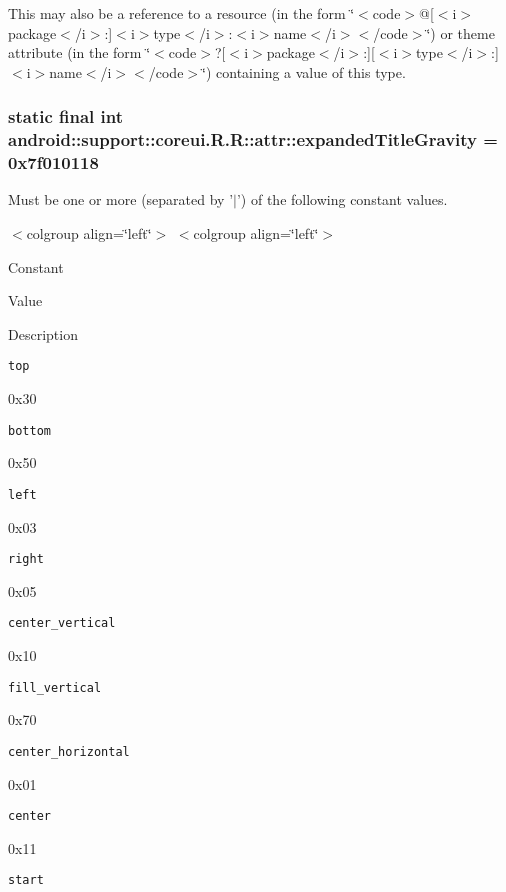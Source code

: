 This may also be a reference to a resource (in the form \char`\"{}$<$code$>$@\mbox{[}$<$i$>$package$<$/i$>$:\mbox{]}$<$i$>$type$<$/i$>$:$<$i$>$name$<$/i$>$$<$/code$>$\char`\"{}) or theme attribute (in the form \char`\"{}$<$code$>$?\mbox{[}$<$i$>$package$<$/i$>$:\mbox{]}\mbox{[}$<$i$>$type$<$/i$>$:\mbox{]}$<$i$>$name$<$/i$>$$<$/code$>$\char`\"{}) containing a value of this type. \hypertarget{classandroid_1_1support_1_1coreui_1_1_r_1_1attr_476150917397124263d793388f178fd0}{
\subsubsection[{expandedTitleGravity}]{\setlength{\rightskip}{0pt plus 5cm}static final int android::support::coreui.R.R::attr::expandedTitleGravity = 0x7f010118}}
\label{classandroid_1_1support_1_1coreui_1_1_r_1_1attr_476150917397124263d793388f178fd0}


Must be one or more (separated by '$|$') of the following constant values. \begin{TabularC}{0}
\hline
\end{TabularC}
$<$colgroup align=\char`\"{}left\char`\"{}$>$ $<$colgroup align=\char`\"{}left\char`\"{}$>$ 

Constant

Value

Description 

{\tt top}

0x30

{\tt bottom}

0x50

{\tt left}

0x03

{\tt right}

0x05

{\tt center\_\-vertical}

0x10

{\tt fill\_\-vertical}

0x70

{\tt center\_\-horizontal}

0x01

{\tt center}

0x11

{\tt start}

